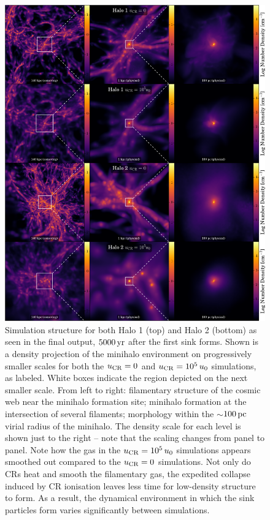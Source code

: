 \documentclass[usenatbib]{mn2e}
\newcommand{\pc}{\,{\rm pc}}
\newcommand{\yr}{\,{\rm yr}}
\newcommand{\ucr}{{u}_{\rm \small CR}}
\begin{document}
\begin{figure}
\begin{center}
\includegraphics[width=.95\textwidth]{figures/structure/structure}
\caption{\label{fig:structure}
Simulation structure for both Halo 1 (top) and Halo 2 (bottom) as seen in the final output, $5000\yr$ after the first sink forms.  
Shown is a density projection of the minihalo environment on progressively smaller scales for both the $\ucr=0$ and $\ucr=10^5\,u_0$ simulations, as labeled.  
White boxes indicate the region depicted on the next smaller scale.  
From left to right: filamentary structure of the cosmic web near the minihalo formation site; minihalo formation at the intersection of several filaments; morphology within the $\sim$$100\pc$ virial radius of the minihalo. 
The density scale for each level is shown just to the right -- note that the scaling changes from panel to panel. Note how the gas in the $\ucr=10^5\,u_0$ simulations appears smoothed out compared to the $\ucr=0$ simulations.  
Not only do CRs heat and smooth the filamentary gas, the expedited collapse induced by CR ionisation leaves less time for low-density structure to form.  
As a result, the dynamical environment in which the sink particles form varies significantly between simulations.%
}
\end{center}
\end{figure}
\end{document}
